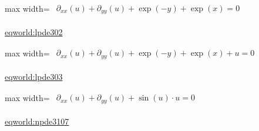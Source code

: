 \documentclass[10pt,a4paper]{article}
\begin{document}
\begin{minipage}{\linewidth}
\begin{center}\begin{adjustbox}{max width=\linewidth}$\displaystyle\begin{gathered}\begin{gathered}\partial_{xx}(u)+\partial_{yy}(u)+\exp(-y)+\exp(x)=0\end{gathered}\end{gathered}$\end{adjustbox}\end{center}
{\small \href{https://eqworld.ipmnet.ru/en/solutions/lpde/lpde302.pdf}{eqworld:lpde302}}\par
\end{minipage}\par\vspace{7mm}

\begin{minipage}{\linewidth}
\begin{center}\begin{adjustbox}{max width=\linewidth}$\displaystyle\begin{gathered}\begin{gathered}\partial_{xx}(u)+\partial_{yy}(u)+\exp(-y)+\exp(x)+u=0\end{gathered}\end{gathered}$\end{adjustbox}\end{center}
{\small \href{https://eqworld.ipmnet.ru/en/solutions/lpde/lpde303.pdf}{eqworld:lpde303}}\par
\end{minipage}\par\vspace{7mm}

\begin{minipage}{\linewidth}
\begin{center}\begin{adjustbox}{max width=\linewidth}$\displaystyle\begin{gathered}\begin{gathered}\partial_{xx}(u)+\partial_{yy}(u)+\sin(u)\cdot u=0\end{gathered}\end{gathered}$\end{adjustbox}\end{center}
{\small \href{https://eqworld.ipmnet.ru/en/solutions/npde/npde3107.pdf}{eqworld:npde3107}}\par
\end{minipage}\par\vspace{7mm}
\end{document}
